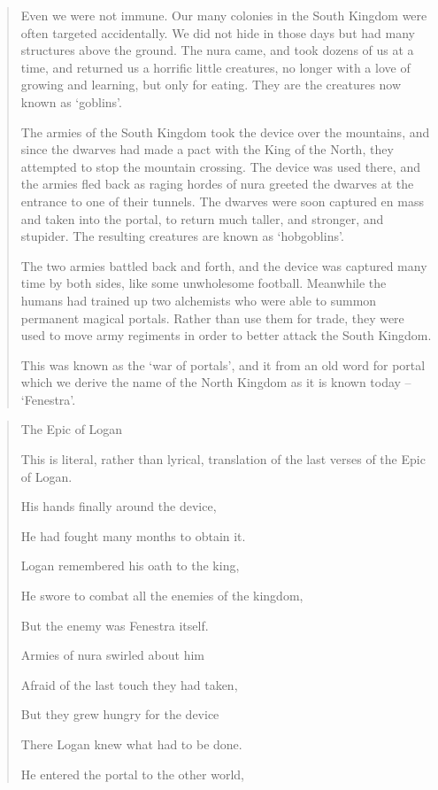 \begin{multicols}{2}
\begin{quotation}
	Even we were not immune.  Our many colonies in the South Kingdom were often targeted accidentally.  We did not hide in those days but had many structures above the ground.  The nura came, and took dozens of us at a time, and returned us a horrific little creatures, no longer with a love of growing and learning, but only for eating.  They are the creatures now known as `goblins'.

	The armies of the South Kingdom took the device over the mountains, and since the dwarves had made a pact with the King of the North, they attempted to stop the mountain crossing.  The device was used there, and the armies fled back as raging hordes of nura greeted the dwarves at the entrance to one of their tunnels.  The dwarves were soon captured en mass and taken into the portal, to return much taller, and stronger, and stupider.  The resulting creatures are known as `hobgoblins'.

	The two armies battled back and forth, and the device was captured many time by both sides, like some unwholesome football.  Meanwhile the humans had trained up two alchemists who were able to summon permanent magical portals.  Rather than use them for trade, they were used to move army regiments in order to better attack the South Kingdom.

	This was known as the `war of portals', and it from an old word for portal which we derive the name of the North Kingdom as it is known today -- `Fenestra'.
\end{quotation}


\begin{verse}
The Epic of Logan

This is literal, rather than lyrical, translation of the last verses of the Epic of Logan.

His hands finally around the device,

He had fought many months to obtain it.

Logan remembered his oath to the king,

He swore to combat all the enemies of the kingdom,

But the enemy was Fenestra itself.

Armies of nura swirled about him

Afraid of the last touch they had taken,

But they grew hungry for the device

There Logan knew what had to be done.

He entered the portal to the other world,


\end{verse}
\end{multicols}
